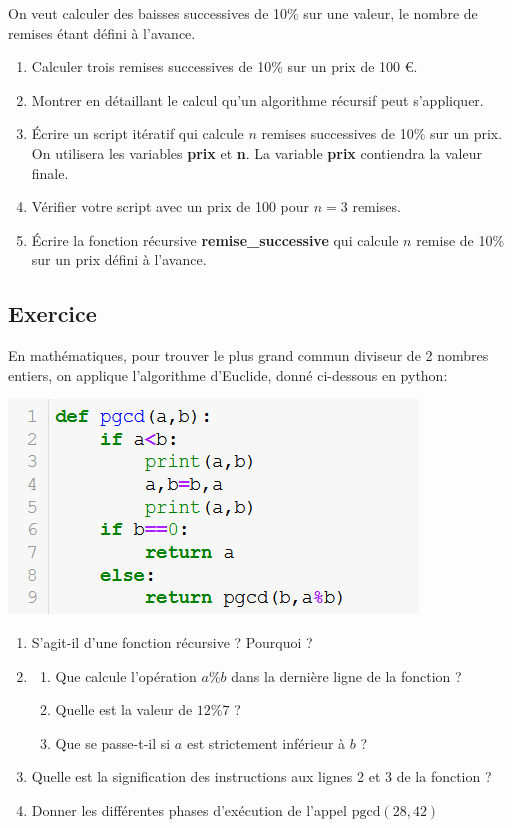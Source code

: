 \documentclass[11pt,a4paper]{article}
\newcounter{numexo}
\begin{document}
On veut calculer des baisses successives de 10\% sur une valeur, le nombre de remises étant défini à l'avance.
\begin{enumerate}
\item Calculer trois remises successives de 10\% sur un prix de 100 \euro.
\item Montrer en détaillant le calcul qu'un algorithme récursif peut s'appliquer.
\item Écrire un script itératif qui calcule $n$ remises successives de 10\% sur un prix. On utilisera les variables \textbf{prix} et \textbf{n}. La variable \textbf{prix} contiendra la valeur finale.
\item Vérifier votre script avec un prix de 100 pour $n=3$ remises.
\item Écrire la fonction récursive \textbf{remise\_successive} qui calcule $n$ remise de 10\% sur un prix défini à l'avance.
\end{enumerate}



\addtocounter{numexo}{1}
\subsection*{\Large Exercice \thenumexo}
En mathématiques, pour trouver le plus grand commun diviseur de 2 nombres entiers, on applique l'algorithme d'Euclide, donné ci-dessous en python:
\begin{center}
\includegraphics[scale=0.8]{img/ex-pgcd.png}
\end{center}

\begin{enumerate}
\item S'agit-il d'une fonction récursive ? Pourquoi ?
\item \begin{enumerate}
\item Que calcule l'opération $a\%b$ dans la dernière ligne de la fonction ?
\item Quelle est la valeur de $12\%7$ ?
\item Que se passe-t-il si $a$ est strictement inférieur à $b$ ?
\end{enumerate} 
\item Quelle est la signification des instructions aux lignes 2 et 3 de la fonction ?
\item Donner les différentes phases d'exécution de l'appel $\text{pgcd}(28,42)$
\end{enumerate} 
\end{document}
